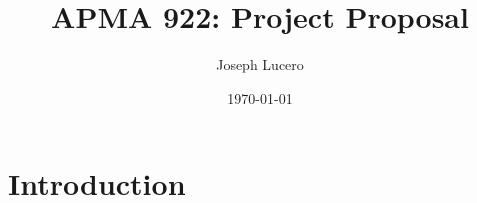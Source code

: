 \documentclass[12pt]{article}
\title{APMA 922: Project Proposal}
\author{Joseph Lucero}
\date{\today}
\newcommand{\kT}{k_{\mathrm{B}}T}
\begin{document}
\maketitle

\section{Introduction}

% 
\end{document}
